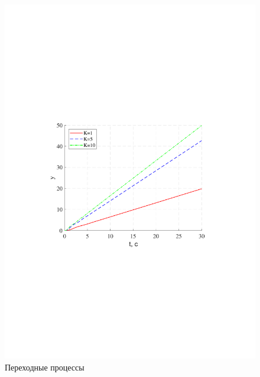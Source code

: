 \documentclass[a4paper,12pt]{article}
\begin{document}
	\begin{figure}[h!]
		\begin{center}
		\renewcommand{\figurename}{Рисунок}
		\includegraphics[width=5in]{ph2MOD.pdf}
		\caption{Переходные процессы} 
		\label{s_5}
		\end{center} 
	\end{figure}
\end{document}
